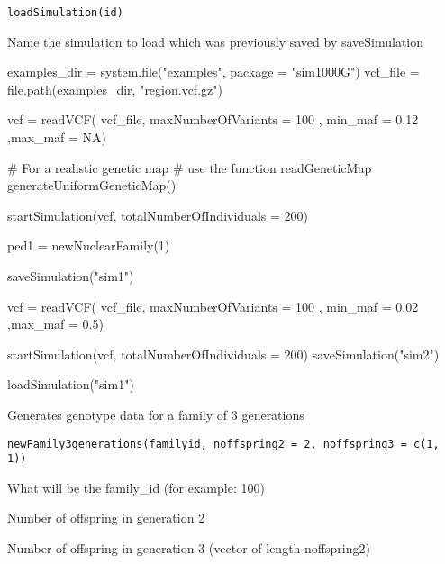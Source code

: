 \documentclass[letterpaper]{book}
\begin{document}
%
\begin{Usage}
\begin{verbatim}
loadSimulation(id)
\end{verbatim}
\end{Usage}
%
\begin{Arguments}
\begin{ldescription}
\item[\code{id}] Name the simulation to load which was previously saved by saveSimulation
\end{ldescription}
\end{Arguments}
%
\begin{Examples}
\begin{ExampleCode}


examples_dir = system.file("examples", package = "sim1000G")
vcf_file = file.path(examples_dir, "region.vcf.gz")

vcf = readVCF( vcf_file, maxNumberOfVariants = 100 ,
           min_maf = 0.12 ,max_maf = NA)

# For a realistic genetic map
# use the function readGeneticMap
generateUniformGeneticMap()

startSimulation(vcf, totalNumberOfIndividuals = 200)

ped1 = newNuclearFamily(1)

saveSimulation("sim1")

vcf = readVCF( vcf_file, maxNumberOfVariants = 100 ,
               min_maf = 0.02 ,max_maf = 0.5)

startSimulation(vcf, totalNumberOfIndividuals = 200)
saveSimulation("sim2")

loadSimulation("sim1")



\end{ExampleCode}
\end{Examples}
%
\begin{Description}\relax
Generates genotype data for a family of 3 generations
\end{Description}
%
\begin{Usage}
\begin{verbatim}
newFamily3generations(familyid, noffspring2 = 2, noffspring3 = c(1, 1))
\end{verbatim}
\end{Usage}
%
\begin{Arguments}
\begin{ldescription}
\item[\code{familyid}] What will be the family\_id (for example: 100)

\item[\code{noffspring2}] Number of offspring in generation 2

\item[\code{noffspring3}] Number of offspring in generation 3 (vector of length noffspring2)
\end{ldescription}
\end{Arguments}
\end{document}
